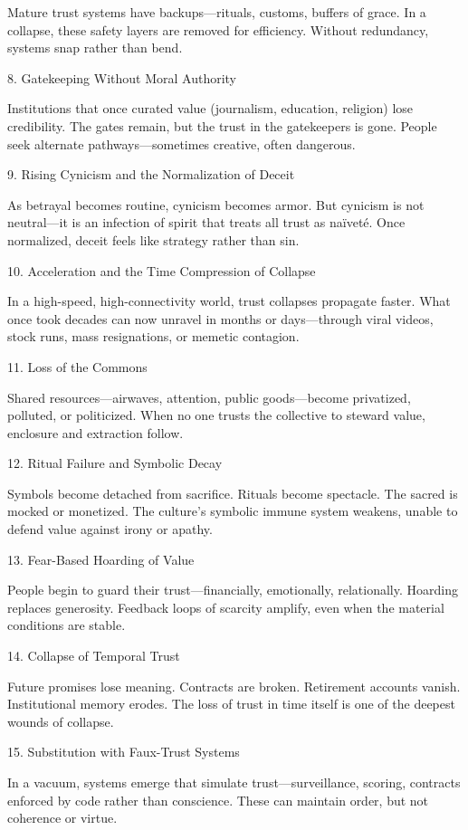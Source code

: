 \documentclass[11pt,oneside]{book}
\begin{document}
Mature trust systems have backups—rituals, customs, buffers of grace. In a collapse, these safety layers are removed for efficiency. Without redundancy, systems snap rather than bend.

8. Gatekeeping Without Moral Authority


Institutions that once curated value (journalism, education, religion) lose credibility. The gates remain, but the trust in the gatekeepers is gone. People seek alternate pathways—sometimes creative, often dangerous.

9. Rising Cynicism and the Normalization of Deceit


As betrayal becomes routine, cynicism becomes armor. But cynicism is not neutral—it is an infection of spirit that treats all trust as naïveté. Once normalized, deceit feels like strategy rather than sin.

10. Acceleration and the Time Compression of Collapse


In a high-speed, high-connectivity world, trust collapses propagate faster. What once took decades can now unravel in months or days—through viral videos, stock runs, mass resignations, or memetic contagion.

11. Loss of the Commons


Shared resources—airwaves, attention, public goods—become privatized, polluted, or politicized. When no one trusts the collective to steward value, enclosure and extraction follow.

12. Ritual Failure and Symbolic Decay


Symbols become detached from sacrifice. Rituals become spectacle. The sacred is mocked or monetized. The culture’s symbolic immune system weakens, unable to defend value against irony or apathy.

13. Fear-Based Hoarding of Value


People begin to guard their trust—financially, emotionally, relationally. Hoarding replaces generosity. Feedback loops of scarcity amplify, even when the material conditions are stable.

14. Collapse of Temporal Trust


Future promises lose meaning. Contracts are broken. Retirement accounts vanish. Institutional memory erodes. The loss of trust in time itself is one of the deepest wounds of collapse.

15. Substitution with Faux-Trust Systems


In a vacuum, systems emerge that simulate trust—surveillance, scoring, contracts enforced by code rather than conscience. These can maintain order, but not coherence or virtue.
\end{document}
